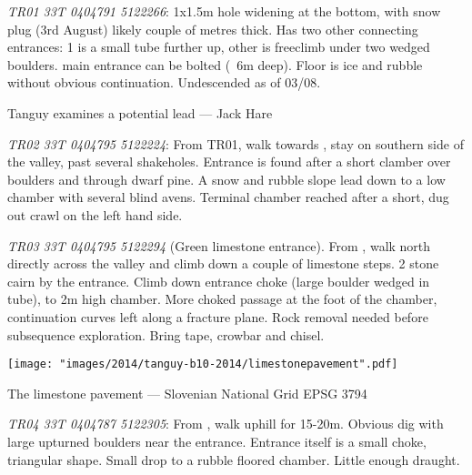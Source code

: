 	
\begin{citemize}
	\item \emph{TR01 33T 0404791 5122266}: 1x1.5m hole widening at the bottom, with snow plug (3rd August) likely couple of metres thick. Has two other connecting entrances: 1 is a small tube further up, other is freeclimb under two wedged boulders. main entrance can be bolted (~6m deep). Floor is ice and rubble without obvious continuation. Undescended as of 03/08.
 
\begin{marginfigure}
        		\centering
        		\caption{Tanguy examines a potential lead --- Jack Hare}
		\label{cave in pavement}
        \end{marginfigure}

	\item \emph{TR02 33T 0404795 5122224}: From TR01, walk towards , stay on southern side of the valley, past several shakeholes. Entrance is found after a short clamber over boulders and through dwarf pine.  A snow and rubble slope lead down to a low chamber with several blind avens. Terminal chamber reached after a short, dug out crawl on the left hand side.

	\item \emph{TR03 33T 0404795 5122294} (Green limestone entrance). From , walk north directly across the valley and climb down a couple of limestone steps. 2 stone cairn by the entrance.  Climb down entrance choke (large boulder wedged in tube), to 2m high chamber. More choked passage at the foot of the chamber, continuation curves left along a fracture plane. Rock removal needed before subsequence exploration. Bring tape, crowbar and chisel.
	
\begin{pagemap}
	\checkoddpage \ifoddpage \forcerectofloat \else \forceversofloat \fi
	\centering
	
	\texttt{[image: "images/2014/tanguy-b10-2014/limestonepavement".pdf]}
	
	\label{map pavement}
	\caption{The limestone pavement --- Slovenian National Grid EPSG 3794}
\end{pagemap}
	
	\item \emph{TR04 33T 0404787 5122305}: From , walk uphill for 15-20m. Obvious dig with large upturned boulders near the entrance. Entrance itself is a small choke, triangular shape. Small drop to a rubble floored chamber. Little enough draught.


\end{citemize}
